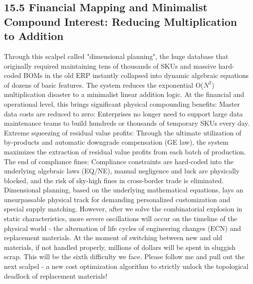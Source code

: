 \documentclass[11pt,a4paper]{article}
\begin{document}
\subsection*{15.5 Financial Mapping and Minimalist Compound Interest: Reducing Multiplication to Addition}


Through this scalpel called "dimensional planning", the huge database that originally required maintaining tens of thousands of SKUs and massive hard-coded BOMs in the old ERP instantly collapsed into dynamic algebraic equations of dozens of basic features. The system reduces the exponential O($N^2$) multiplication disaster to a minimalist linear addition logic. At the financial and operational level, this brings significant physical compounding benefits: Master data costs are reduced to zero: Enterprises no longer need to support large data maintenance teams to build hundreds or thousands of temporary SKUs every day. Extreme squeezing of residual value profits: Through the ultimate utilization of by-products and automatic downgrade compensation (GE law), the system maximizes the extraction of residual value profits from each batch of production. The end of compliance fines: Compliance constraints are hard-coded into the underlying algebraic laws (EQ/NE), manual negligence and luck are physically blocked, and the risk of sky-high fines in cross-border trade is eliminated. Dimensional planning, based on the underlying mathematical equations, lays an unsurpassable physical track for demanding personalized customization and special supply matching. However, after we solve the combinatorial explosion in static characteristics, more severe oscillations will occur on the timeline of the physical world - the alternation of life cycles of engineering changes (ECN) and replacement materials. At the moment of switching between new and old materials, if not handled properly, millions of dollars will be spent in sluggish scrap. This will be the sixth difficulty we face. Please follow me and pull out the next scalpel - a new cost optimization algorithm to strictly unlock the topological deadlock of replacement materials!
\end{document}
